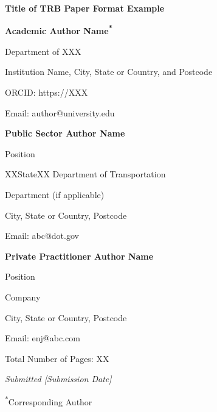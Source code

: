 \documentclass[12pt,letterpaper]{article}
\begin{document}
\begin{flushleft}
{\bfseries Title of TRB Paper Format Example}\par   %
\vspace{12pt}

{\bfseries Academic Author Name\textsuperscript{*}}\par
Department of XXX\par
Institution Name, City, State or Country, and Postcode\par
ORCID: https://XXX\par
Email: author@university.edu\par
\vspace{12pt}

{\bfseries Public Sector Author Name}\par
Position\par
XXStateXX Department of Transportation\par
Department (if applicable)\par
City, State or Country, Postcode\par
Email: abc@dot.gov\par
\vspace{12pt}

{\bfseries Private Practitioner Author Name}\par
Position\par
Company\par
City, State or Country, Postcode\par
Email: enj@abc.com\par
\vspace{12pt}

Total Number of Pages: XX\par                       %
\vspace{12pt}

\textit{Submitted [Submission Date]}\par             %
\textsuperscript{*}Corresponding Author\par
\end{flushleft}

\vspace{6pt}

\end{document}
